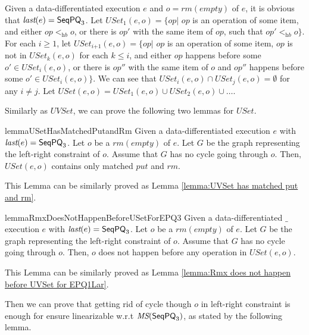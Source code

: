 Given a data-differentiated execution $e$ and $o = \textit{rm}(\textit{empty})$ of $e$, it is obvious that $\textit{last}(e) = \mathsf{SeqPQ}_3$. Let $\textit{USet}_1(e,o) = \{ \textit{op} \vert$ $\textit{op}$ is an operation of some item, and either $\textit{op} <_{\textit{hb}} o$, or there is $\textit{op}'$ with the same item of $\textit{op}$, such that $\textit{op}' <_{\textit{hb}} o \}$. For each $i \geq 1$, let $\textit{USet}_{\textit{i+1}}(e,o) = \{ \textit{op} \vert$ $\textit{op}$ is an operation of some item, $\textit{op}$ is not in $\textit{USet}_k(e,o)$ for each $k \leq i$, and either $\textit{op}$ happens before some $o' \in \textit{USet}_i(e,o)$, or there is $\textit{op}''$ with the same item of $o$ and $\textit{op}''$ happens before some $o' \in \textit{USet}_i(e,o) \}$. We can see that $\textit{USet}_i(e,o) \cap \textit{USet}_j(e,o) = \emptyset$ for any $i \neq j$. Let $\textit{USet}(e,o) = \textit{USet}_1(e,o) \cup \textit{USet}_2(e,o) \cup \ldots$.


Similarly as $\textit{UVSet}$, we can prove the following two lemmas for $\textit{USet}$.

\begin{restatable}{lemma}{USetHasMatchedPutandRm}
\label{lemma:USet has matched put and rm}
Given a data-differentiated execution $e$ with $\textit{last}(e) = \mathsf{SeqPQ}_3$. Let $o$ be a $\textit{rm}(\textit{empty})$ of $e$. Let $G$ be the graph representing the left-right constraint of $o$. Assume that $G$ has no cycle going through $o$. Then, $\textit{USet}(e,o)$ contains only matched $\textit{put}$ and $\textit{rm}$.
\end{restatable}

This Lemma can be similarly proved as Lemma \ref{lemma:UVSet has matched put and rm}.


\begin{restatable}{lemma}{RmxDoesNotHappenBeforeUSetForEPQ3}
\label{lemma:Rmx does not happen before USet for EPQ3}
Given a data-differentiated $\_$execution $e$ with $\textit{last}(e) = \mathsf{SeqPQ}_3$. Let $o$ be a $\textit{rm}(\textit{empty})$ of $e$. Let $G$ be the graph representing the left-right constraint of $o$. Assume that $G$ has no cycle going through $o$. Then, $o$ does not happen before any operation in $\textit{USet}(e,o)$.
\end{restatable}

This Lemma can be similarly proved as Lemma \ref{lemma:Rmx does not happen before UVSet for EPQ1Lar}.

Then we can prove that getting rid of cycle though $o$ in left-right constraint is enough for ensure linearizable w.r.t $\textit{MS}(\mathsf{SeqPQ}_3)$, as stated by the following lemma.


